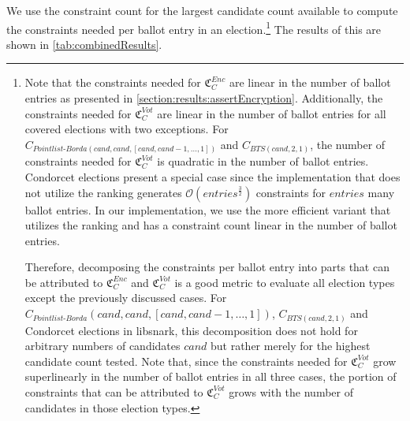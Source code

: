 We use the constraint count for the largest candidate count available to compute the constraints needed per ballot entry in an election.\footnote{
    \label{footnote:votEncLinearInBallotEntries}
    Note that the constraints needed for $\mathfrak{C}_C^{Enc}$ are linear in the number of ballot entries as presented in \cref{section:results:assertEncryption}.
    Additionally, the constraints needed for $\mathfrak{C}_C^{Vot}$ are linear in the number of ballot entries for all covered elections with two exceptions.
    For $C_{Pointlist\text{-}Borda(cand, cand, [cand, cand-1, \dots, 1])}$ and $C_{BTS(cand, 2, 1)}$, the number of constraints needed for $\mathfrak{C}_C^{Vot}$ is quadratic in the number of ballot entries.
    Condorcet elections present a special case since the implementation that does not utilize the ranking generates $\mathcal{O}(entries^{\frac{3}{2}})$ constraints for $entries$ many ballot entries.
    In our implementation, we use the more efficient variant that utilizes the ranking and has a constraint count linear in the number of ballot entries.

    Therefore, decomposing the constraints per ballot entry into parts that can be attributed to $\mathfrak{C}_C^{Enc}$ and $\mathfrak{C}_C^{Vot}$ is a good metric to evaluate all election types except the previously discussed cases.
    For $C_{Pointlist\text{-}Borda}(cand, cand, [cand, cand-1, \dots, 1])$, $C_{BTS(cand, 2, 1)}$ and Condorcet elections in libsnark, this decomposition does not hold for arbitrary numbers of candidates $cand$ but rather merely for the highest candidate count tested.
    Note that, since the constraints needed for $\mathfrak{C}_C^{Vot}$ grow superlinearly in the number of ballot entries in all three cases, the portion of constraints that can be attributed to $\mathfrak{C}_C^{Vot}$ grows with the number of candidates in those election types.
}
The results of this are shown in \cref{tab:combinedResults}.

